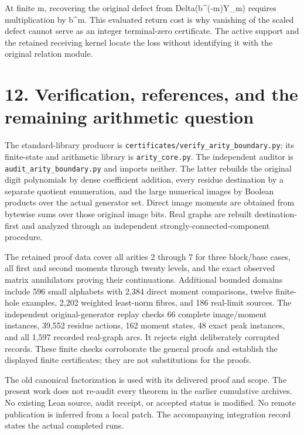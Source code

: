 At finite m, recovering the original defect from Delta(b\^{}(-m)Y\_m) requires multiplication by b\^{}m. This evaluated return cost is why vanishing of the scaled defect cannot serve as an integer terminal-zero certificate. The active support and the retained receiving kernel locate the loss without identifying it with the original relation module.

\section{12. Verification, references, and the remaining arithmetic question}\label{n20-verification-references-and-the-remaining-arithmetic-question}

The standard-library producer is \nolinkurl{certificates/verify_arity_boundary.py}; its finite-state and arithmetic library is \texttt{arity\_core.py}. The independent auditor is \texttt{audit\_arity\_boundary.py} and imports neither. The latter rebuilds the original digit polynomials by dense coefficient addition, every residue destination by a separate quotient enumeration, and the large numerical images by Boolean products over the actual generator set. Direct image moments are obtained from bytewise sums over those original image bits. Real graphs are rebuilt destination-first and analyzed through an independent strongly-connected-component procedure.

The retained proof data cover all arities 2 through 7 for three block/base cases, all first and second moments through twenty levels, and the exact observed matrix annihilators proving their continuations. Additional bounded domains include 596 small alphabets with 2,384 direct moment comparisons, twelve finite-hole examples, 2,202 weighted least-norm fibres, and 186 real-limit sources. The independent original-generator replay checks 66 complete image/moment instances, 39,552 residue actions, 162 moment states, 48 exact peak instances, and all 1,597 recorded real-graph arcs. It rejects eight deliberately corrupted records. These finite checks corroborate the general proofs and establish the displayed finite certificates; they are not substitutions for the proofs.

The old canonical factorization is used with its delivered proof and scope. The present work does not re-audit every theorem in the earlier cumulative archives. No existing Lean source, audit receipt, or accepted status is modified. No remote publication is inferred from a local patch. The accompanying integration record states the actual completed runs.

